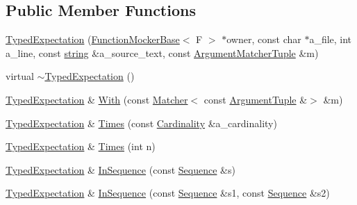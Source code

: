 \subsection*{Public Member Functions}
\begin{DoxyCompactItemize}
\item 
\hyperlink{classtesting_1_1internal_1_1TypedExpectation_a10bd0a8fa0db37215be42e1c61ccbc28}{Typed\+Expectation} (\hyperlink{classtesting_1_1internal_1_1FunctionMockerBase}{Function\+Mocker\+Base}$<$ F $>$ $\ast$owner, const char $\ast$a\+\_\+file, int a\+\_\+line, const \hyperlink{namespacetesting_1_1internal_a8e8ff5b11e64078831112677156cb111}{string} \&a\+\_\+source\+\_\+text, const \hyperlink{classtesting_1_1internal_1_1TypedExpectation_a8f10e3906761cc5c10fa3561c6e8938e}{Argument\+Matcher\+Tuple} \&m)
\item 
virtual \hyperlink{classtesting_1_1internal_1_1TypedExpectation_a4d73d7edd81f1b1418a33931fe728158}{$\sim$\+Typed\+Expectation} ()
\item 
\hyperlink{classtesting_1_1internal_1_1TypedExpectation}{Typed\+Expectation} \& \hyperlink{classtesting_1_1internal_1_1TypedExpectation_aa69c4f9b1f2cce49609023d7e5f65297}{With} (const \hyperlink{classtesting_1_1Matcher}{Matcher}$<$ const \hyperlink{classtesting_1_1internal_1_1TypedExpectation_a9a91379262d101f435809ba4556d14fa}{Argument\+Tuple} \&$>$ \&m)
\item 
\hyperlink{classtesting_1_1internal_1_1TypedExpectation}{Typed\+Expectation} \& \hyperlink{classtesting_1_1internal_1_1TypedExpectation_a9a4c34ee5c6e6adc880a22f61f33da57}{Times} (const \hyperlink{classtesting_1_1Cardinality}{Cardinality} \&a\+\_\+cardinality)
\item 
\hyperlink{classtesting_1_1internal_1_1TypedExpectation}{Typed\+Expectation} \& \hyperlink{classtesting_1_1internal_1_1TypedExpectation_a92d56ee785d38ec8193aed2a0fcbccf0}{Times} (int n)
\item 
\hyperlink{classtesting_1_1internal_1_1TypedExpectation}{Typed\+Expectation} \& \hyperlink{classtesting_1_1internal_1_1TypedExpectation_ada9e9081a98435991310ac60483d1230}{In\+Sequence} (const \hyperlink{classtesting_1_1Sequence}{Sequence} \&s)
\item 
\hyperlink{classtesting_1_1internal_1_1TypedExpectation}{Typed\+Expectation} \& \hyperlink{classtesting_1_1internal_1_1TypedExpectation_ac0f45c73e3f816796f6c5dea2dc70131}{In\+Sequence} (const \hyperlink{classtesting_1_1Sequence}{Sequence} \&s1, const \hyperlink{classtesting_1_1Sequence}{Sequence} \&s2)
\item 

\end{DoxyCompactItemize}

